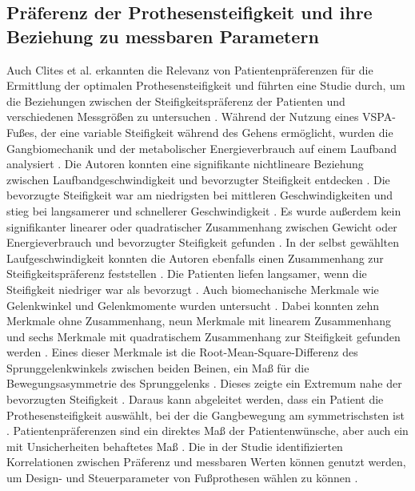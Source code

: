 \subsection{Präferenz der Prothesensteifigkeit und ihre Beziehung zu messbaren Parametern}
Auch Clites et al. erkannten die Relevanz von Patientenpräferenzen für die Ermittlung der optimalen Prothesensteifigkeit und führten eine Studie durch, um die Beziehungen zwischen der Steifigkeitspräferenz der Patienten und verschiedenen Messgrößen zu untersuchen \cite{Clites.2021}. Während der Nutzung eines VSPA-Fußes, der eine variable Steifigkeit während des Gehens ermöglicht, wurden die Gangbiomechanik und der metabolischer Energieverbrauch auf einem Laufband analysiert \cite{Clites.2021}.
Die Autoren konnten eine signifikante nichtlineare Beziehung zwischen Laufbandgeschwindigkeit und bevorzugter Steifigkeit entdecken \cite{Clites.2021}. Die bevorzugte Steifigkeit war am niedrigsten bei mittleren Geschwindigkeiten und stieg bei langsamerer und schnellerer Geschwindigkeit \cite{Clites.2021}. Es wurde außerdem kein signifikanter linearer oder quadratischer Zusammenhang zwischen Gewicht oder Energieverbrauch und bevorzugter Steifigkeit gefunden \cite{Clites.2021}.
In der selbst gewählten Laufgeschwindigkeit konnten die Autoren ebenfalls einen Zusammenhang zur Steifigkeitspräferenz feststellen \cite{Clites.2021}. Die Patienten liefen langsamer, wenn die Steifigkeit niedriger war als bevorzugt \cite{Clites.2021}.
Auch biomechanische Merkmale wie Gelenkwinkel und Gelenkmomente wurden untersucht \cite{Clites.2021}. Dabei konnten zehn Merkmale ohne Zusammenhang, neun Merkmale mit linearem Zusammenhang und sechs Merkmale mit quadratischem Zusammenhang zur Steifigkeit gefunden werden \cite{Clites.2021}. Eines dieser Merkmale ist die Root-Mean-Square-Differenz des Sprunggelenkwinkels zwischen beiden Beinen, ein Maß für die Bewegungsasymmetrie des Sprunggelenks \cite{Clites.2021}. Dieses zeigte ein Extremum nahe der bevorzugten Steifigkeit \cite{Clites.2021}.
Daraus kann abgeleitet werden, dass ein Patient die Prothesensteifigkeit auswählt, bei der die Gangbewegung am symmetrischsten ist \cite{Clites.2021}.
Patientenpräferenzen sind ein direktes Maß der Patientenwünsche, aber auch ein mit Unsicherheiten behaftetes Maß \cite{Clites.2021}. Die in der Studie identifizierten Korrelationen zwischen Präferenz und messbaren Werten können genutzt werden, um Design- und Steuerparameter von Fußprothesen wählen zu können \cite{Clites.2021}.


